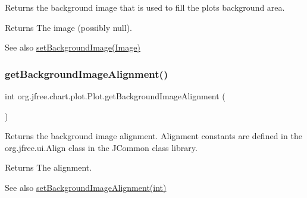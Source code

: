Returns the background image that is used to fill the plot\textquotesingle{}s background area.

\begin{DoxyReturn}{Returns}
The image (possibly {\ttfamily null}).
\end{DoxyReturn}
\begin{DoxySeeAlso}{See also}
\mbox{\hyperlink{classorg_1_1jfree_1_1chart_1_1plot_1_1_plot_a93449bff646ac0c3a63c0657842a2e70}{set\+Background\+Image(\+Image)}} 
\end{DoxySeeAlso}
\mbox{\label{classorg_1_1jfree_1_1chart_1_1plot_1_1_plot_ae0d72cd3dcbd9d4aad47d98d00a976ce}} 
\subsubsection{\texorpdfstring{get\+Background\+Image\+Alignment()}{getBackgroundImageAlignment()}}
{\footnotesize\ttfamily int org.\+jfree.\+chart.\+plot.\+Plot.\+get\+Background\+Image\+Alignment (\begin{DoxyParamCaption}{ }\end{DoxyParamCaption})}

Returns the background image alignment. Alignment constants are defined in the {\ttfamily org.\+jfree.\+ui.\+Align} class in the J\+Common class library.

\begin{DoxyReturn}{Returns}
The alignment.
\end{DoxyReturn}
\begin{DoxySeeAlso}{See also}
\mbox{\hyperlink{classorg_1_1jfree_1_1chart_1_1plot_1_1_plot_aa2e7bd23e9c5e6785519e74335ff3af0}{set\+Background\+Image\+Alignment(int)}} 
\end{DoxySeeAlso}
\mbox{\label{classorg_1_1jfree_1_1chart_1_1plot_1_1_plot_a20cf4bf1ab215cef716eac03f336879c}} 
